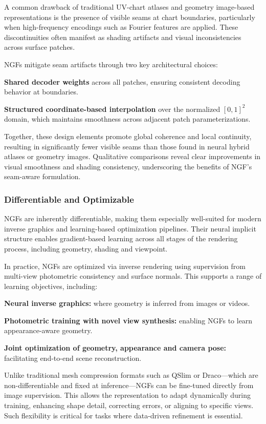 A common drawback of traditional UV-chart atlases and geometry image-based representations is the presence of visible seams at chart boundaries, particularly when high-frequency encodings such as Fourier features are applied. 
These discontinuities often manifest as shading artifacts and visual inconsistencies across surface patches. 

NGFs mitigate seam artifacts through two key architectural choices: 

\textbf{Shared decoder weights} across all patches, ensuring consistent decoding behavior at boundaries. 

\textbf{Structured coordinate-based interpolation} over the normalized $[0,1]^2$ domain, which maintains smoothness across adjacent patch parameterizations. 

Together, these design elements promote global coherence and local continuity, resulting in significantly fewer visible seams than those found in neural hybrid atlases or geometry images. 
Qualitative comparisons reveal clear improvements in visual smoothness and shading consistency, underscoring the benefits of NGF’s seam-aware formulation. 

\subsubsection{Differentiable and Optimizable}

NGFs are inherently differentiable, making them especially well-suited for modern inverse graphics and learning-based optimization pipelines. 
Their neural implicit structure enables gradient-based learning across all stages of the rendering process, including geometry, shading and viewpoint. 

In practice, NGFs are optimized via inverse rendering using supervision from multi-view photometric consistency and surface normals. 
This supports a range of learning objectives, including: 

\textbf{Neural inverse graphics:} where geometry is inferred from images or videos. 

\textbf{Photometric training with novel view synthesis:} enabling NGFs to learn appearance-aware geometry. 

\textbf{Joint optimization of geometry, appearance and camera pose:} facilitating end-to-end scene reconstruction. 

Unlike traditional mesh compression formats such as QSlim or Draco—which are non-differentiable and fixed at inference—NGFs can be fine-tuned directly from image supervision. 
This allows the representation to adapt dynamically during training, enhancing shape detail, correcting errors, or aligning to specific views. 
Such flexibility is critical for tasks where data-driven refinement is essential. 

